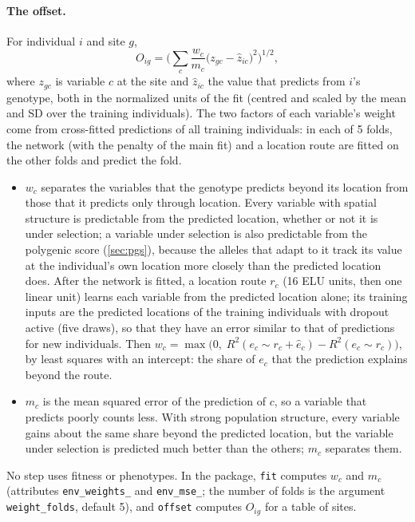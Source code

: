 \paragraph{The \ecolocator offset.} For individual $i$ and site $g$,
\begin{equation*}
O_{ig} = \Big(\sum_c \frac{w_c}{m_c} \big(z_{gc} - \hat{z}_{ic}\big)^2\Big)^{1/2},
\end{equation*}
where $z_{gc}$ is variable $c$ at the site and $\hat{z}_{ic}$ the value
that \ecolocator predicts from $i$'s genotype, both in the normalized units
of the fit (centred and scaled by the mean and SD over the training
individuals). The two factors of each variable's weight come from
cross-fitted predictions of all training individuals: in each of 5 folds,
the network (with the penalty of the main fit) and a location route are
fitted on the other folds and predict the fold.
\begin{itemize}
\item $w_c$ separates the variables that the genotype predicts beyond its
  location from those that it predicts only through location. Every
  variable with spatial structure is predictable from the predicted
  location, whether or not it is under selection; a variable under
  selection is also predictable from the polygenic score (\cref{sec:pgs}),
  because the alleles that adapt to it track its value at the individual's
  own location more closely than the predicted location does. After the
  network is fitted, a location route $r_c$ (16 ELU units, then one linear
  unit) learns each variable from the predicted location alone; its
  training inputs are the predicted locations of the training individuals
  with dropout active (five draws), so that they have an error similar to
  that of predictions for new individuals. Then
  $w_c = \max\!\big(0,\; R^2(e_c \sim r_c + \hat{e}_c) - R^2(e_c \sim r_c)\big)$,
  by least squares with an intercept: the share of $e_c$ that the
  prediction explains beyond the route.
\item $m_c$ is the mean squared error of the prediction of $c$, so a
  variable that \ecolocator predicts poorly counts less. With strong
  population structure, every variable gains about the same share beyond
  the predicted location, but the variable under selection is predicted
  much better than the others; $m_c$ separates them.
\end{itemize}
No step uses fitness or phenotypes. In the \ecolocator package,
\texttt{fit} computes $w_c$ and $m_c$ (attributes
\texttt{env\_weights\_} and \texttt{env\_mse\_}; the number of folds is
the argument \texttt{weight\_folds}, default 5), and \texttt{offset}
computes $O_{ig}$ for a table of sites.

